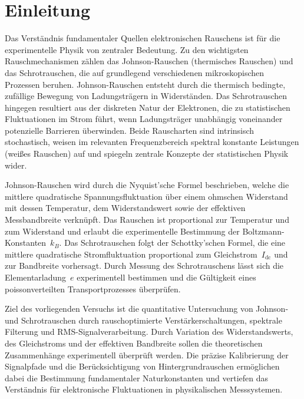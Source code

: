 \chapter{Einleitung}
Das Verständnis fundamentaler Quellen elektronischen Rauschens ist für die experimentelle Physik von zentraler Bedeutung. 
Zu den wichtigsten Rauschmechanismen zählen das Johnson-Rauschen (thermisches Rauschen) und das Schrotrauschen, die auf grundlegend verschiedenen mikroskopischen Prozessen beruhen. 
Johnson-Rauschen entsteht durch die thermisch bedingte, zufällige Bewegung von Ladungsträgern in Widerständen. 
Das Schrotrauschen hingegen resultiert aus der diskreten Natur der Elektronen, die zu statistischen Fluktuationen im Strom führt, wenn Ladungsträger unabhängig voneinander potenzielle Barrieren überwinden. 
Beide Rauscharten sind intrinsisch stochastisch, weisen im relevanten Frequenzbereich spektral konstante Leistungen (weißes Rauschen) auf und spiegeln zentrale Konzepte der statistischen Physik wider.

Johnson-Rauschen wird durch die Nyquist'sche Formel beschrieben, welche die mittlere quadratische Spannungsfluktuation über einem ohmschen Widerstand mit dessen Temperatur, dem Widerstandswert sowie der effektiven Messbandbreite verknüpft. 
Das Rauschen ist proportional zur Temperatur und zum Widerstand und erlaubt die experimentelle Bestimmung der Boltzmann-Konstanten~$k_B$. 
Das Schrotrauschen folgt der Schottky'schen Formel, die eine mittlere quadratische Stromfluktuation proportional zum Gleichstrom~$I_{\mathrm{dc}}$ und zur Bandbreite vorhersagt. 
Durch Messung des Schrotrauschens lässt sich die Elementarladung~$e$ experimentell bestimmen und die Gültigkeit eines poissonverteilten Transportprozesses überprüfen.

Ziel des vorliegenden Versuchs ist die quantitative Untersuchung von Johnson- und Schrotrauschen durch rauschoptimierte Verstärkerschaltungen, spektrale Filterung und RMS-Signalverarbeitung. 
Durch Variation des Widerstandswerts, des Gleichstroms und der effektiven Bandbreite sollen die theoretischen Zusammenhänge experimentell überprüft werden. 
Die präzise Kalibrierung der Signalpfade und die Berücksichtigung von Hintergrundrauschen ermöglichen dabei die Bestimmung fundamentaler Naturkonstanten und vertiefen das Verständnis für elektronische Fluktuationen in physikalischen Messsystemen.

